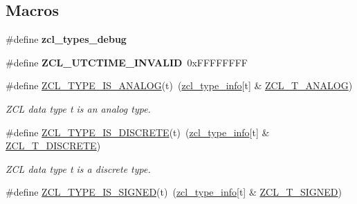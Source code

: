 \subsection*{Macros}
\begin{DoxyCompactItemize}
\item 
\mbox{\label{group__zcl__types_ga6017ac37035b8b2b8a7fd864f8654c35}} 
\#define {\bfseries zcl\+\_\+types\+\_\+debug}
\item 
\mbox{\label{group__zcl__types_ga615c98b6baffcb91fa19285f2557845a}} 
\#define {\bfseries Z\+C\+L\+\_\+\+U\+T\+C\+T\+I\+M\+E\+\_\+\+I\+N\+V\+A\+L\+ID}~0x\+F\+F\+F\+F\+F\+F\+FF
\item 
\mbox{\label{group__zcl__types_ga6e143abd16187cc59cdad352c1fde4bf}} 
\#define \hyperlink{group__zcl__types_ga6e143abd16187cc59cdad352c1fde4bf}{Z\+C\+L\+\_\+\+T\+Y\+P\+E\+\_\+\+I\+S\+\_\+\+A\+N\+A\+L\+OG}(t)~(\hyperlink{group__zcl__types_ga0f5737f60f1f37fb3b375e9fd5fe664d}{zcl\+\_\+type\+\_\+info}\mbox{[}t\mbox{]} \& \hyperlink{group__zcl__types_ga7b609984d4662f83a2248d1f485fd4ad}{Z\+C\+L\+\_\+\+T\+\_\+\+A\+N\+A\+L\+OG})
\begin{DoxyCompactList}\small\item\em Z\+CL data type {\itshape t} is an analog type. \end{DoxyCompactList}\item 
\mbox{\label{group__zcl__types_gafac9417148b2a7a3fbd64d84baf98cf7}} 
\#define \hyperlink{group__zcl__types_gafac9417148b2a7a3fbd64d84baf98cf7}{Z\+C\+L\+\_\+\+T\+Y\+P\+E\+\_\+\+I\+S\+\_\+\+D\+I\+S\+C\+R\+E\+TE}(t)~(\hyperlink{group__zcl__types_ga0f5737f60f1f37fb3b375e9fd5fe664d}{zcl\+\_\+type\+\_\+info}\mbox{[}t\mbox{]} \& \hyperlink{group__zcl__types_ga3e9bf95af4f58a0c9c5c34639b0dda29}{Z\+C\+L\+\_\+\+T\+\_\+\+D\+I\+S\+C\+R\+E\+TE})
\begin{DoxyCompactList}\small\item\em Z\+CL data type {\itshape t} is a discrete type. \end{DoxyCompactList}\item 
\mbox{\label{group__zcl__types_ga9114be7b872a013b27e06e4aa437318f}} 
\#define \hyperlink{group__zcl__types_ga9114be7b872a013b27e06e4aa437318f}{Z\+C\+L\+\_\+\+T\+Y\+P\+E\+\_\+\+I\+S\+\_\+\+S\+I\+G\+N\+ED}(t)~(\hyperlink{group__zcl__types_ga0f5737f60f1f37fb3b375e9fd5fe664d}{zcl\+\_\+type\+\_\+info}\mbox{[}t\mbox{]} \& \hyperlink{group__zcl__types_gaacf8dcd439ce0388d90681aec545e4e3}{Z\+C\+L\+\_\+\+T\+\_\+\+S\+I\+G\+N\+ED})

\end{DoxyCompactItemize}
